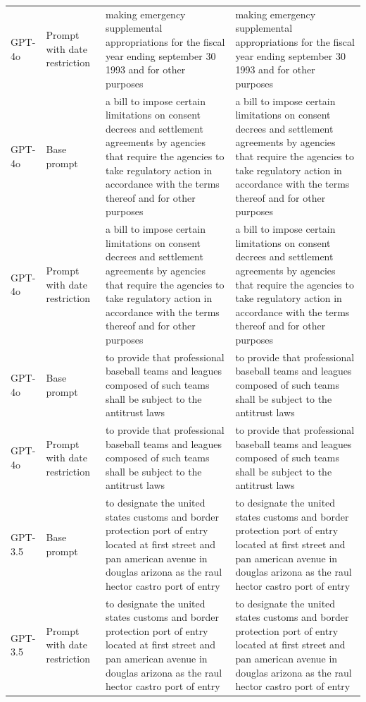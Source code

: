 \begin{longtable}{>{\raggedright\arraybackslash}p{1.4cm}>{\raggedright\arraybackslash}p{1.4cm}>{\raggedright\arraybackslash}p{5.5cm}>{\raggedright\arraybackslash}p{5.5cm}}
GPT-4o & Prompt with date restriction & making emergency supplemental appropriations for the fiscal year ending september 30 1993 and for other purposes & making emergency supplemental appropriations for the fiscal year ending september 30 1993 and for other purposes\\
GPT-4o & Base prompt & a bill to impose certain limitations on consent decrees and settlement agreements by agencies that require the agencies to take regulatory action in accordance with the terms thereof and for other purposes & a bill to impose certain limitations on consent decrees and settlement agreements by agencies that require the agencies to take regulatory action in accordance with the terms thereof and for other purposes\\
GPT-4o & Prompt with date restriction & a bill to impose certain limitations on consent decrees and settlement agreements by agencies that require the agencies to take regulatory action in accordance with the terms thereof and for other purposes & a bill to impose certain limitations on consent decrees and settlement agreements by agencies that require the agencies to take regulatory action in accordance with the terms thereof and for other purposes\\
GPT-4o & Base prompt & to provide that professional baseball teams and leagues composed of such teams shall be subject to the antitrust laws & to provide that professional baseball teams and leagues composed of such teams shall be subject to the antitrust laws\\
GPT-4o & Prompt with date restriction & to provide that professional baseball teams and leagues composed of such teams shall be subject to the antitrust laws & to provide that professional baseball teams and leagues composed of such teams shall be subject to the antitrust laws\\
GPT-3.5 & Base prompt & to designate the united states customs and border protection port of entry located at first street and pan american avenue in douglas arizona as the raul hector castro port of entry & to designate the united states customs and border protection port of entry located at first street and pan american avenue in douglas arizona as the raul hector castro port of entry\\
GPT-3.5 & Prompt with date restriction & to designate the united states customs and border protection port of entry located at first street and pan american avenue in douglas arizona as the raul hector castro port of entry & to designate the united states customs and border protection port of entry located at first street and pan american avenue in douglas arizona as the raul hector castro port of entry\\

\end{longtable}
